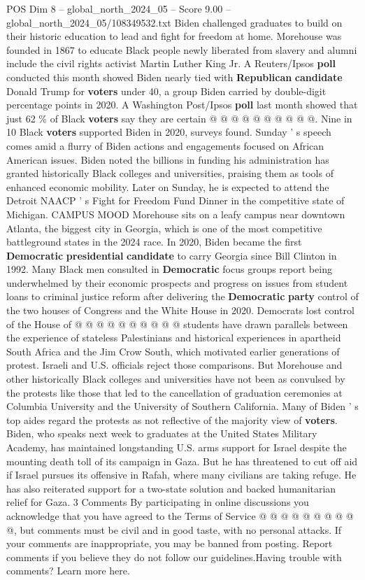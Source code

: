 \begin{textsample}{POS Dim 8 – global\_north\_2024\_05 – Score 9.00 – global\_north\_2024\_05/108349532.txt}
Biden challenged graduates to build on their historic education to lead and fight for freedom at home.
Morehouse was founded in 1867 to educate Black people newly liberated from slavery and alumni include the civil rights activist Martin Luther King Jr.
A Reuters/Ipsos \textbf{poll} conducted this month showed Biden nearly tied with \textbf{Republican} \textbf{candidate} Donald Trump for \textbf{voters} under 40, a group Biden carried by double-digit percentage points in 2020.
A Washington Post/Ipsos \textbf{poll} last month showed that just 62 \% of Black \textbf{voters} say they are certain @ @ @ @ @ @ @ @ @ @.
Nine in 10 Black \textbf{voters} supported Biden in 2020, surveys found.
Sunday ' s speech comes amid a flurry of Biden actions and engagements focused on African American issues.
Biden noted the billions in funding his administration has granted historically Black colleges and universities, praising them as tools of enhanced economic mobility.
Later on Sunday, he is expected to attend the Detroit NAACP ' s Fight for Freedom Fund Dinner in the competitive state of Michigan.
CAMPUS MOOD Morehouse sits on a leafy campus near downtown Atlanta, the biggest city in Georgia, which is one of the most competitive battleground states in the 2024 race.
In 2020, Biden became the first \textbf{Democratic} \textbf{presidential} \textbf{candidate} to carry Georgia since Bill Clinton in 1992.
Many Black men consulted in \textbf{Democratic} focus groups report being underwhelmed by their economic prospects and progress on issues from student loans to criminal justice reform after delivering the \textbf{Democratic} \textbf{party} control of the two houses of Congress and the White House in 2020.
Democrats lost control of the House of @ @ @ @ @ @ @ @ @ @ students have drawn parallels between the experience of stateless Palestinians and historical experiences in apartheid South Africa and the Jim Crow South, which motivated earlier generations of protest.
Israeli and U.S. officials reject those comparisons.
But Morehouse and other historically Black colleges and universities have not been as convulsed by the protests like those that led to the cancellation of graduation ceremonies at Columbia University and the University of Southern California.
Many of Biden ' s top aides regard the protests as not reflective of the majority view of \textbf{voters}.
Biden, who speaks next week to graduates at the United States Military Academy, has maintained longstanding U.S. arms support for Israel despite the mounting death toll of its campaign in Gaza.
But he has threatened to cut off aid if Israel pursues its offensive in Rafah, where many civilians are taking refuge.
He has also reiterated support for a two-state solution and backed humanitarian relief for Gaza. 3 Comments By participating in online discussions you acknowledge that you have agreed to the Terms of Service @ @ @ @ @ @ @ @ @ @, but comments must be civil and in good taste, with no personal attacks.
If your comments are inappropriate, you may be banned from posting.
Report comments if you believe they do not follow our guidelines.Having trouble with comments?
Learn more here.


\end{textsample}
